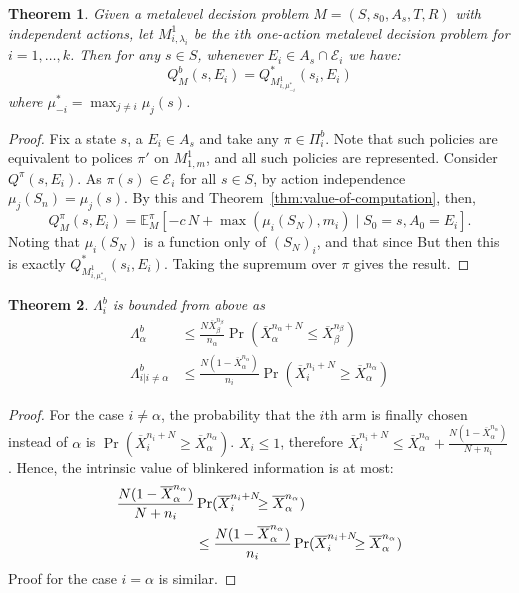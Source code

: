 \documentclass[]{article}
\newcommand {\IE} {\ensuremath {\mathbb{E}}}
\newcommand {\Evidence} {\mathcal{E}}
\newcommand {\given} {\mid} %
\newtheorem{thm}{Theorem}
\newcommand{\thmref}[1]{Theorem~\ref{#1}}
\begin{document}
	\begin{thm}\label{thm:blinkered}
	Given a metalevel decision problem $M=(S,s_0,A_s,T,R)$ with independent actions,
	let $M^1_{i,\lambda_i}$ be the $i$th one-action metalevel decision problem for $i=1,\dots,k$.
	Then for any $s\in S$, whenever $E_i\in A_s\cap\Evidence_i$ we have:
	\[
		Q^b_M(s,E_i) = Q^*_{M^1_{i,\mu^*_{-i}}}(s_i, E_i)
	\]
	where $\mu^*_{-i} = \max_{j\neq i} \mu_j(s)$.
	\end{thm}

	\begin{hiddenproof}
		\begin{proof}
		Fix a state $s$, a $E_i\in A_s$ and take any $\pi\in\Pi^b_i$.  Note that such policies
		are equivalent to polices $\pi'$ on $M^1_{1,m}$, and all such policies are represented.
		Consider $Q^\pi(s,E_i)$.  As $\pi(s)\in\Evidence_i$ for all $s\in S$, by action independence $\mu_j(S_n) = \mu_j(s)$.
		By this and \thmref{thm:value-of-computation}, then,
		\[
			Q^\pi_M(s,E_i) = \IE^\pi_M[ -c\,N + \max(\mu_i(S_N), m_i) \given S_0=s, A_0=E_i].
		\]
		Noting that $\mu_i(S_N)$ is a function only of $(S_N)_i$, and that since 
		But then this is exactly $Q^*_{M^1_{i,\mu^*_{-i}}}(s_i, E_i)$.  Taking the supremum
		over $\pi$ gives the result.
		\end{proof}	
	\end{hiddenproof}





\begin{thm} $\Lambda_i^b$ is bounded from above as
\begin{align}
\label{eqn:thm-be}
  \Lambda_\alpha^b&\le \frac {N \overline X_\beta^{n_\beta}} {n_\alpha} \Pr(\overline X_\alpha^{n_\alpha+N}\le\overline X_\beta^{n_\beta})\nonumber\\
\Lambda_{i|i\ne\alpha}^b&\le \frac {N(1-\overline X_\alpha^{n_\alpha})} {n_i}\Pr(\overline   X_i^{{n_i}+N}\ge\overline X_\alpha^{n_\alpha})
\end{align}
\label{thm:be}
\end{thm}
	\vspace{-2em}
	\begin{proof} For the case $i\ne \alpha$, the probability that the
	  $i$th arm is finally chosen instead of $\alpha$ is
	  $\Pr(\overline X_i^{n_i+N} \ge \overline X_\alpha^{n_\alpha})$. $X_i \le 1$,
	  therefore $\overline X_i^{n_i+N}\le \overline
	  X_\alpha^{n_\alpha}+\frac {N(1-\overline X_\alpha^{n_\alpha})} {N+n_i}$. Hence, the intrinsic value of blinkered
	  information is at most: 
	\begin{align}
	\label{eq:simplistic}
	\frac{ N(1-\overline  X_\alpha^{n_\alpha})}
	  {N+n_i}&\Pr(\overline X_i^{{n_i}+N}\hspace{-0.5em}\ge\overline X_\alpha^{n_\alpha})\nonumber \\
	&\le\frac{ N(1-\overline  X_\alpha^{n_\alpha})}
	{n_i}\Pr(\overline X_i^{{n_i}+N}\hspace{-0.5em}\ge\overline X_\alpha^{n_\alpha})
	\end{align}
	  Proof for the case $i=\alpha$ is similar.
	\end{proof}	
\end{document}
